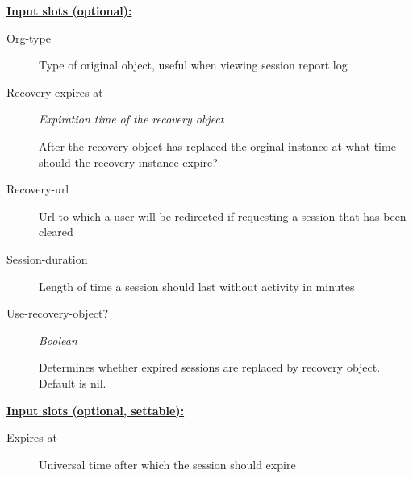 \documentclass [11pt]{book}
\begin{document}
\begin{itemize}
\begin{description}
\end{description}








\textbf{
\underline{Input slots (optional):}}

\begin{description}

\item [Org-type]

Type of original object, useful when viewing session report log




\item [Recovery-expires-at]
\emph{Expiration time of the recovery object}

 After the recovery object has replaced the orginal
instance at what time should the recovery instance expire?




\item [Recovery-url]

Url to which a user will be redirected if requesting a session that has been cleared




\item [Session-duration]

Length of time a session should last without activity in minutes




\item [Use-recovery-object?]
\emph{Boolean}

 Determines whether expired sessions are replaced by recovery object. Default is nil.




\end{description}






\textbf{
\underline{Input slots (optional, settable):}}

\begin{description}

\item [Expires-at]

Universal time after which the session should expire





\end{description}
\end{itemize}
\end{document}
